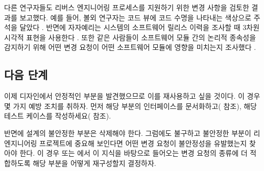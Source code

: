 \documentclass[a4paper,10pt,twoside]{book}
\begin{document}
다른 연구자들도 리버스 엔지니어링 프로세스를 지원하기 위한 변경 사항을 검토한 결과를 보고했다. 예를 들어, 볼외 연구자는 코드 뷰에 코드 수명을 나타내는 색상으로 주석을 달았다 \cite{Ball96a}. 반면에 자자예리는 시스템의 소프트웨어 릴리스 이력을 조사할 때 3차원 시각적 표현을 사용한다 \cite{Jaza99a}. 또한 같은 사람들이 소프트웨어 모듈 간의 논리적 종속성을 감지하기 위해 어떤 변경 요청이 어떤 소프트웨어 모듈에 영향을 미치는지 조사했다 \cite{Gall98a}.

\subsection*{다음 단계}

이제 디자인에서 안정적인 부분을 발견했으므로 이를 재사용하고 싶을 것이다. 이 경우 몇 가지 예방 조치를 취하자. 먼저 해당 부분의 인터페이스를 문서화하고( 참조), 해당 테스트 케이스를 작성하세요( 참조).

반면에 설계의 불안정한 부분은 삭제해야 한다. 그럼에도 불구하고 불안정한 부분이 리엔지니어링 프로젝트에 중요해 보인다면 어떤 변경 요청이 불안정성을 유발했는지 찾아야 한다. 이 경우  또는 에서 이 지식을 바탕으로 들어오는 변경 요청의 종류에 더 적합하도록 해당 부분을 어떻게 재구성할지 결정하자.

\ifx\wholebook\relax\else
   
   
   
\end{document}
